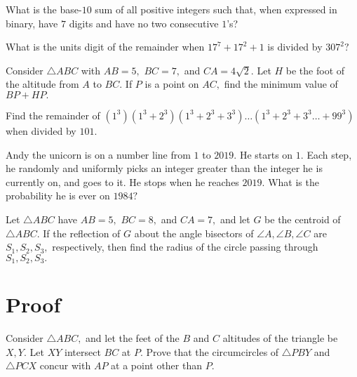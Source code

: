 \documentclass{lucky}
\begin{document}
\begin{prob}{4}
    What is the base-$10$ sum of all positive integers such that, when expressed in binary, have $7$ digits and have no two consecutive $1$'s?
\end{prob}

\begin{req}[JMC 10 2020/22]{4}
    What is the units digit of the remainder when $17^7+17^2+1$ is divided by $307^2?$
\end{req}

\begin{prob}{6}
    Consider $\triangle ABC$ with $AB=5,$ $BC=7,$ and $CA=4\sqrt{2}.$ Let $H$ be the foot of the altitude from $A$ to $BC.$ If $P$ is a point on $AC,$ find the minimum value of $BP+HP.$
\end{prob}

\begin{prob}{6}
    Find the remainder of $(1^3)(1^3+2^3)(1^3+2^3+3^3)\dots(1^3+2^3+3^3\dots+99^3)$ when divided by $101.$
\end{prob}

\begin{req}{9}
    Andy the unicorn is on a number line from $1$ to $2019.$ He starts on $1.$ Each step, he randomly and uniformly picks an integer greater than the integer he is currently on, and goes to it. He stops when he reaches $2019.$ What is the probability he is ever on $1984?$
\end{req}

\begin{prob}{9}
    Let $\triangle ABC$ have $AB=5,$ $BC=8,$ and $CA=7,$ and let $G$ be the centroid of $\triangle ABC.$ If the reflection of $G$ about the angle bisectors of $\angle A,\angle B,\angle C$ are $S_1,S_2,S_3,$ respectively, then find the radius of the circle passing through $S_1,S_2,S_3.$
\end{prob}

\newpage

\section{Proof}


\begin{prob}{3}
    Consider $\triangle ABC,$ and let the feet of the $B$ and $C$ altitudes of the triangle be $X,Y.$ Let $XY$ intersect $BC$ at $P.$ Prove that the circumcircles of $\triangle PBY$ and $\triangle PCX$ concur with $AP$ at a point other than $P.$
\end{prob}
\end{document}
